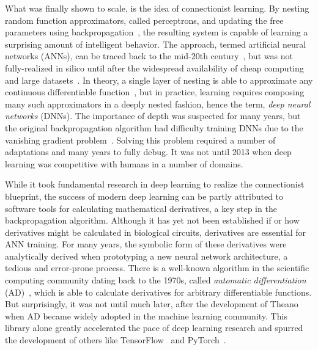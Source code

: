 \documentclass[12pt,initial,twoside,maitrise]{dms}
\numberwithin{equation}{section}
\numberwithin{table}{chapter}
\numberwithin{figure}{chapter}
\begin{document}
What was finally shown to scale, is the idea of connectionist learning. By nesting random function approximators, called perceptrons, and updating the free parameters using backpropagation~\citep{werbos1990backpropagation, rumelhart1988learning}, the resulting system is capable of learning a surprising amount of intelligent behavior. The approach, termed artificial neural networks (ANNs), can be traced back to the mid-20th century~\citep{ivakhnenko1965cybernetic, rosenblatt1958perceptron}, but was not fully-realized in silico until after the widespread availability of cheap computing and large datasets~\citep{lecun2015deep}. In theory, a single layer of nesting is able to approximate any continuous differentiable function~\citep{hornik1989multilayer}, but in practice, learning requires composing many such approximators in a deeply nested fashion, hence the term, \textit{deep neural networks} (DNNs). The importance of depth was suspected for many years, but the original backpropagation algorithm had difficulty training DNNs due to the vanishing gradient problem~\citep{bengio1994learning}. Solving this problem required a number of adaptations and many years to fully debug. It was not until 2013 when deep learning was competitive with humans in a number of domains.

While it took fundamental research in deep learning to realize the connectionist blueprint, the success of modern deep learning can be partly attributed to software tools for calculating mathematical derivatives, a key step in the backpropagation algorithm. Although it has yet not been established if or how derivatives might be calculated in biological circuits, derivatives are essential for ANN training. For many years, the symbolic form of these derivatives were analytically derived when prototyping a new neural network architecture, a tedious and error-prone process. There is a well-known algorithm in the scientific computing community dating back to the 1970s, called \textit{automatic differentiation} (AD)~\citep{linnainmaa1970representation, griewank1989automatic}, which is able to calculate derivatives for arbitrary differentiable functions. But surprisingly, it was not until much later, after the development of Theano~\citep{theano} when AD became widely adopted in the machine learning community. This library alone greatly accelerated the pace of deep learning research and spurred the development of others like TensorFlow~\citep{abadi2016tensorflow} and PyTorch~\citep{paszke2017automatic}.
\end{document}
